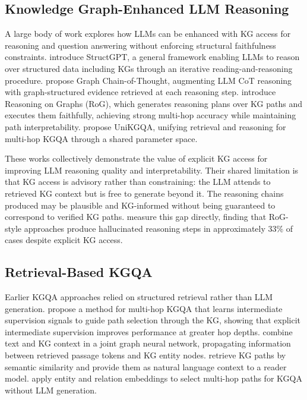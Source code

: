 \subsection{Knowledge Graph-Enhanced LLM Reasoning}

A large body of work explores how LLMs can be enhanced with KG access for reasoning and question answering without enforcing structural faithfulness constraints. \citet{jiang2023structgpt} introduce StructGPT, a general framework enabling LLMs to reason over structured data including KGs through an iterative reading-and-reasoning procedure. \citet{jin2024graphcot} propose Graph Chain-of-Thought, augmenting LLM CoT reasoning with graph-structured evidence retrieved at each reasoning step. \citet{luo2024rog} introduce Reasoning on Graphs (RoG), which generates reasoning plans over KG paths and executes them faithfully, achieving strong multi-hop accuracy while maintaining path interpretability. \citet{jiang2022unikgqa} propose UniKGQA, unifying retrieval and reasoning for multi-hop KGQA through a shared parameter space.

These works collectively demonstrate the value of explicit KG access for improving LLM reasoning quality and interpretability. Their shared limitation is that KG access is advisory rather than constraining: the LLM attends to retrieved KG context but is free to generate beyond it. The reasoning chains produced may be plausible and KG-informed without being guaranteed to correspond to verified KG paths. \citet{luo2024gcr} measure this gap directly, finding that RoG-style approaches produce hallucinated reasoning steps in approximately 33\% of cases despite explicit KG access.

\subsection{Retrieval-Based KGQA}

Earlier KGQA approaches relied on structured retrieval rather than LLM generation. \citet{he2021multihop} propose a method for multi-hop KGQA that learns intermediate supervision signals to guide path selection through the KG, showing that explicit intermediate supervision improves performance at greater hop depths. \citet{yasunaga2021qagnn} combine text and KG context in a joint graph neural network, propagating information between retrieved passage tokens and KG entity nodes. \citet{shi2021kgpath} retrieve KG paths by semantic similarity and provide them as natural language context to a reader model. \citet{saxena2022kgqa} apply entity and relation embeddings to select multi-hop paths for KGQA without LLM generation.

